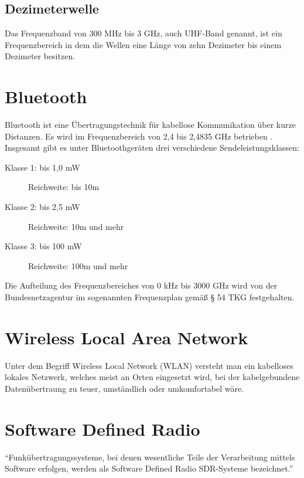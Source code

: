 \subsection{Dezimeterwelle}
Das Frequenzband von 300 MHz bis 3 GHz, auch \ac{UHF}-Band genannt, ist ein Frequenzbereich in dem die Wellen eine Länge von zehn Dezimeter bis einem Dezimeter besitzen.

\section{Bluetooth}
Bluetooth ist eine Übertragungstechnik für kabellose Kommunikation über kurze Distanzen. Es wird im Frequenzbereich von 2,4 bis 2,4835 GHz betrieben \cite[Bundesamt für Strahlenschutz, S. 1]{bundesamt-strahlungsschutz:2012}. Insgesamt gibt es unter Bluetoothgeräten drei verschiedene Sendeleistungsklassen:
\begin{description}
	\item[Klasse 1: bis 1,0 mW] Reichweite: bis 10m 
	\item [Klasse 2: bis 2,5 mW] Reichweite: 10m und mehr
	\item [Klasse 3: bis 100 mW] Reichweite: 100m und mehr
\end{description}
Die Aufteilung des Frequenzbereiches von 0 kHz bis 3000 GHz wird von der Bundesnetzagentur im sogenannten Frequenzplan \cite[Bundesnetzagentur]{bundesnetzagentur-frequenzplan:2016} gemäß § 54 TKG festgehalten.

\section{Wireless Local Area Network}
Unter dem Begriff Wireless Local Network (WLAN) versteht man ein kabelloses lokales Netzwerk, welches meist an Orten eingesetzt wird, bei der kabelgebundene Datenübertraung zu teuer, umständlich oder umkomfortabel wäre.

\section{Software Defined Radio} 
\enquote{Funkübertragungssysteme, bei denen wesentliche Teile der Verarbeitung mittels Software erfolgen, werden als Software Defined Radio \ac{SDR}-Systeme bezeichnet.} \cite[Heuberger, e. a., S. 1]{Heuberger:2017}


